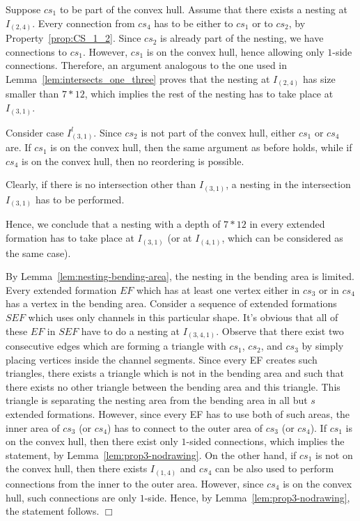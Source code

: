 \documentclass[a4paper,10pt]{llncs}
\newcounter{prop}
\renewenvironment{proof}
{{\bf Proof:}}{\hspace*{\fill}$\Box$\par\vspace{2mm}}
\begin{document}
\begin{proof}
Suppose $cs_1$ to be part of the convex hull. Assume that there exists a nesting at $I_{(2,4)}$. Every connection from $cs_4$ has to be either to $cs_1$ or to $cs_2$, by Property~\ref{prop:CS_1_2}. Since $cs_2$ is already part of the nesting, we have connections to $cs_1$. However, $cs_1$ is on the convex hull, hence allowing only $1$-side connections. Therefore, an argument analogous to the one used in Lemma~\ref{lem:intersects_one_three} proves that the nesting at $I_{(2,4)}$ has size smaller than $7*12$, which implies the rest of the nesting has to take place at $I_{(3,1)}$.

Consider case $I^l_{(3,1)}$. Since $cs_2$ is not part of the convex hull, either $cs_1$ or $cs_4$ are. If $cs_1$ is on the convex hull, then the same argument as before holds, while if $cs_4$ is on the convex hull, then no reordering is possible.

Clearly, if there is no intersection other than $I_{(3,1)}$, a nesting in the intersection $I_{(3,1)}$ has to be performed.

Hence, we conclude that a nesting with a depth of $7*12$ in every extended formation has to take place at $I_{(3,1)}$ (or at $I_{(4,1)}$, which can be considered as the same case).

By Lemma~\ref{lem:nesting-bending-area}, the nesting in the bending area is limited. Every extended formation $EF$ which has at least one vertex either in $cs_3$ or in $cs_4$ has a vertex in the bending area. Consider a sequence of extended formations $SEF$ which uses only channels in this particular shape. It's obvious that all of these $EF$ in $SEF$ have to do a nesting at $I_{({3,4},1)}$. Observe that there exist two consecutive edges which are forming a triangle with $cs_1$, $cs_2$, and $cs_3$ by simply placing vertices inside the channel segments. Since every EF creates such triangles, there exists a triangle which is not in the bending area and such that there exists no other triangle
between the bending area and this triangle. This triangle is separating the nesting area from the bending area in all but $s$ extended formations. However, since every EF has to use both of such areas, the inner area of $cs_3$ (or $cs_4$) has to connect to the outer area of $cs_3$ (or $cs_4$). If $cs_1$ is on the convex hull, then there exist only $1$-sided connections, which implies the statement, by Lemma~\ref{lem:prop3-nodrawing}.
On the other hand, if $cs_1$ is not on the convex hull, then there exists $I_{(1,4)}$ and $cs_4$ can be also used to perform connections from the inner to the outer area. However, since $cs_4$ is on the convex hull, such connections are only $1$-side. Hence, by Lemma~\ref{lem:prop3-nodrawing}, the statement follows.
\end{proof}
\end{document}
